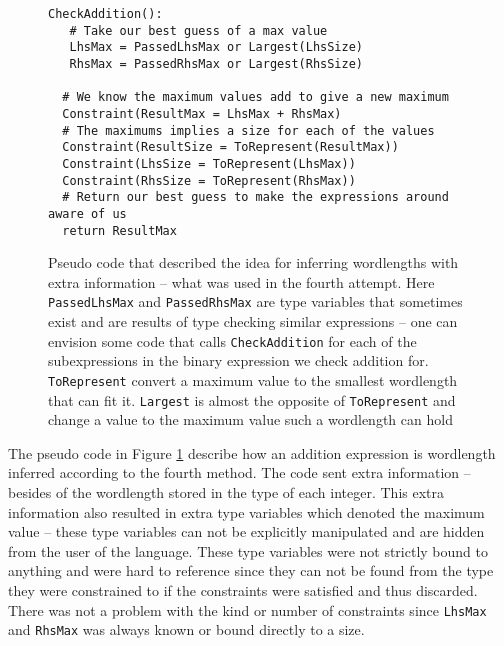 \begin{figure}[h!]
\begin{verbatim}
CheckAddition():
   # Take our best guess of a max value
   LhsMax = PassedLhsMax or Largest(LhsSize)
   RhsMax = PassedRhsMax or Largest(RhsSize)

  # We know the maximum values add to give a new maximum
  Constraint(ResultMax = LhsMax + RhsMax)
  # The maximums implies a size for each of the values
  Constraint(ResultSize = ToRepresent(ResultMax))
  Constraint(LhsSize = ToRepresent(LhsMax))
  Constraint(RhsSize = ToRepresent(RhsMax))
  # Return our best guess to make the expressions around aware of us
  return ResultMax
\end{verbatim}
  \cprotect\caption{Pseudo code that described the idea for inferring wordlengths with extra information -- what was used in the fourth attempt. Here \verb+PassedLhsMax+ and \verb+PassedRhsMax+ are type variables that sometimes exist and are results of type checking similar expressions -- one can envision some code that calls \verb+CheckAddition+ for each of the subexpressions in the binary expression we check addition for. \verb+ToRepresent+ convert a maximum value to the smallest wordlength that can fit it. \verb+Largest+ is almost the opposite of \verb+ToRepresent+ and change a value to the maximum value such a wordlength can hold}
\label{fig:pseudoFour}
\end{figure}

The pseudo code in Figure \ref{fig:pseudoFour} describe how an addition expression is wordlength inferred according to the fourth method. The code sent extra information -- besides of the wordlength stored in the type of each integer. This extra information also resulted in extra type variables which denoted the maximum value -- these type variables can not be explicitly manipulated and are hidden from the user of the language. These type variables were not strictly bound to anything and were hard to reference since they can not be found from the type they were constrained to if the constraints were satisfied and thus discarded. There was not a problem with the kind or number of constraints since \verb+LhsMax+ and \verb+RhsMax+ was always known or bound directly to a size.


